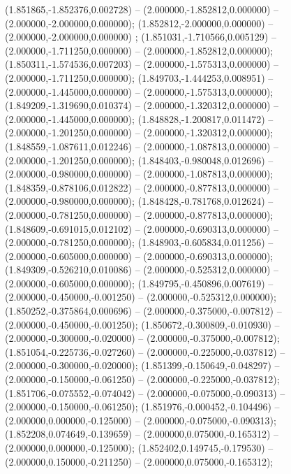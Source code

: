  (1.851865,-1.852376,0.002728) -- (2.000000,-1.852812,0.000000) -- (2.000000,-2.000000,0.000000);
 (1.852812,-2.000000,0.000000) -- (2.000000,-2.000000,0.000000) ;
 (1.851031,-1.710566,0.005129) -- (2.000000,-1.711250,0.000000) -- (2.000000,-1.852812,0.000000);
 (1.850311,-1.574536,0.007203) -- (2.000000,-1.575313,0.000000) -- (2.000000,-1.711250,0.000000);
 (1.849703,-1.444253,0.008951) -- (2.000000,-1.445000,0.000000) -- (2.000000,-1.575313,0.000000);
 (1.849209,-1.319690,0.010374) -- (2.000000,-1.320312,0.000000) -- (2.000000,-1.445000,0.000000);
 (1.848828,-1.200817,0.011472) -- (2.000000,-1.201250,0.000000) -- (2.000000,-1.320312,0.000000);
 (1.848559,-1.087611,0.012246) -- (2.000000,-1.087813,0.000000) -- (2.000000,-1.201250,0.000000);
 (1.848403,-0.980048,0.012696) -- (2.000000,-0.980000,0.000000) -- (2.000000,-1.087813,0.000000);
 (1.848359,-0.878106,0.012822) -- (2.000000,-0.877813,0.000000) -- (2.000000,-0.980000,0.000000);
 (1.848428,-0.781768,0.012624) -- (2.000000,-0.781250,0.000000) -- (2.000000,-0.877813,0.000000);
 (1.848609,-0.691015,0.012102) -- (2.000000,-0.690313,0.000000) -- (2.000000,-0.781250,0.000000);
 (1.848903,-0.605834,0.011256) -- (2.000000,-0.605000,0.000000) -- (2.000000,-0.690313,0.000000);
 (1.849309,-0.526210,0.010086) -- (2.000000,-0.525312,0.000000) -- (2.000000,-0.605000,0.000000);
 (1.849795,-0.450896,0.007619) -- (2.000000,-0.450000,-0.001250) -- (2.000000,-0.525312,0.000000);
 (1.850252,-0.375864,0.000696) -- (2.000000,-0.375000,-0.007812) -- (2.000000,-0.450000,-0.001250);
 (1.850672,-0.300809,-0.010930) -- (2.000000,-0.300000,-0.020000) -- (2.000000,-0.375000,-0.007812);
 (1.851054,-0.225736,-0.027260) -- (2.000000,-0.225000,-0.037812) -- (2.000000,-0.300000,-0.020000);
 (1.851399,-0.150649,-0.048297) -- (2.000000,-0.150000,-0.061250) -- (2.000000,-0.225000,-0.037812);
 (1.851706,-0.075552,-0.074042) -- (2.000000,-0.075000,-0.090313) -- (2.000000,-0.150000,-0.061250);
 (1.851976,-0.000452,-0.104496) -- (2.000000,0.000000,-0.125000) -- (2.000000,-0.075000,-0.090313);
 (1.852208,0.074649,-0.139659) -- (2.000000,0.075000,-0.165312) -- (2.000000,0.000000,-0.125000);
 (1.852402,0.149745,-0.179530) -- (2.000000,0.150000,-0.211250) -- (2.000000,0.075000,-0.165312);
